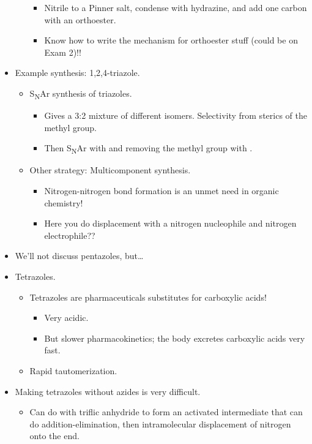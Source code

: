 \documentclass[../notes.tex]{subfiles}
\begin{document}
\begin{itemize}
\begin{itemize}
\begin{itemize}
            \item Nitrile to a Pinner salt, condense with hydrazine, and add one carbon with an orthoester.
            \item Know how to write the mechanism for orthoester stuff (could be on Exam 2)!!
        \end{itemize}
    \end{itemize}
    \item Example synthesis: 1,2,4-triazole.
    \begin{itemize}
        \item S\textsubscript{N}Ar synthesis of triazoles.
        \begin{itemize}
            \item Gives a 3:2 mixture of different isomers. Selectivity from sterics of the methyl group.
            \item Then S\textsubscript{N}Ar with  and removing the methyl group with .
        \end{itemize}
        \item Other strategy: Multicomponent synthesis.
        \begin{itemize}
            \item Nitrogen-nitrogen bond formation is an unmet need in organic chemistry!
            \item Here you do displacement with a nitrogen nucleophile and nitrogen electrophile??
        \end{itemize}
    \end{itemize}
    \item We'll not discuss pentazoles, but\dots
    \item Tetrazoles.
    \begin{itemize}
        \item Tetrazoles are pharmaceuticals substitutes for carboxylic acids!
        \begin{itemize}
            \item Very acidic.
            \item But slower pharmacokinetics; the body excretes carboxylic acids very fast.
        \end{itemize}
        \item Rapid tautomerization.
    \end{itemize}
    \item Making tetrazoles without azides is very difficult.
    \begin{itemize}
        \item Can do with triflic anhydride to form an activated intermediate that can do addition-elimination, then intramolecular displacement of nitrogen onto the end.

\end{itemize}
\end{itemize}
\end{document}
